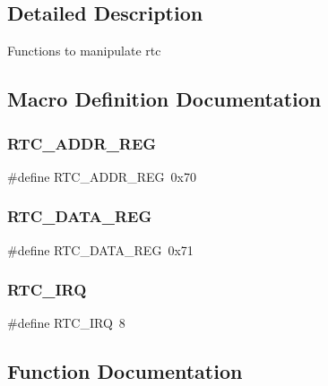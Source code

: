 \subsection{Detailed Description}
Functions to manipulate rtc 

\subsection{Macro Definition Documentation}
\hypertarget{group__rtc_ga710b98232df2c563009e6f8a6cd18220}{}\label{group__rtc_ga710b98232df2c563009e6f8a6cd18220} 
\subsubsection{\texorpdfstring{R\+T\+C\+\_\+\+A\+D\+D\+R\+\_\+\+R\+EG}{RTC\_ADDR\_REG}}
{\footnotesize\ttfamily \#define R\+T\+C\+\_\+\+A\+D\+D\+R\+\_\+\+R\+EG~0x70}

\hypertarget{group__rtc_ga2f258a00c59c3f347c8d2d4a75471ce0}{}\label{group__rtc_ga2f258a00c59c3f347c8d2d4a75471ce0} 
\subsubsection{\texorpdfstring{R\+T\+C\+\_\+\+D\+A\+T\+A\+\_\+\+R\+EG}{RTC\_DATA\_REG}}
{\footnotesize\ttfamily \#define R\+T\+C\+\_\+\+D\+A\+T\+A\+\_\+\+R\+EG~0x71}

\hypertarget{group__rtc_ga4e22feb6ffbc1cda32fadff5c740dc51}{}\label{group__rtc_ga4e22feb6ffbc1cda32fadff5c740dc51} 
\subsubsection{\texorpdfstring{R\+T\+C\+\_\+\+I\+RQ}{RTC\_IRQ}}
{\footnotesize\ttfamily \#define R\+T\+C\+\_\+\+I\+RQ~8}



\subsection{Function Documentation}
\hypertarget{group__rtc_ga9a66dc15a321b825a97887478a95e28f}{}\label{group__rtc_ga9a66dc15a321b825a97887478a95e28f} 

